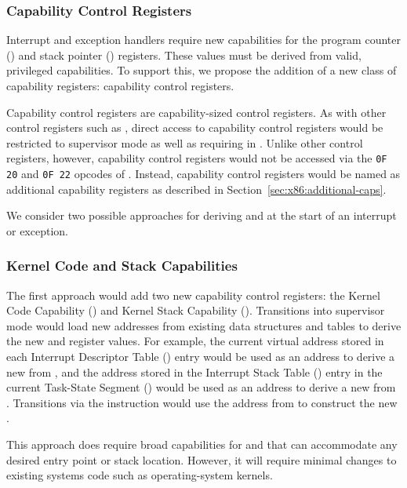\subsubsection{Capability Control Registers}
\label{sec:x86:capability-control-registers}

Interrupt and exception handlers require new capabilities for the
program counter (\CIP{}) and stack pointer (\CSP{}) registers.  These
values must be derived from valid, privileged capabilities.  To
support this, we propose the addition of a new class of capability
registers: capability control registers.

Capability control registers are capability-sized control registers.
As with other control registers such as \CRFOUR, direct access to
capability control registers would be restricted to supervisor mode as
well as requiring \cappermASR{} in \CIP{}.  Unlike other control
registers, however, capability control registers would not be accessed
via the \texttt{0F 20} and \texttt{0F 22} opcodes of .
Instead, capability control registers would be named as additional
capability registers as described in
Section~\ref{sec:x86:additional-caps}.

We consider two possible approaches for deriving \CIP{} and \CSP{} at
the start of an interrupt or exception.

\subsubsection{Kernel Code and Stack Capabilities}

The first approach would add two new capability control registers: the Kernel
Code Capability (\KCC{}) and Kernel Stack Capability (\KSC{}).  Transitions into
supervisor mode would load new addresses from
existing data structures and tables to derive the new \CIP{} and \CSP{}
register values.  For example, the current virtual address stored in
each Interrupt Descriptor Table (\IDT{}) entry would be used as an
address to derive a new \CIP{} from \KCC{}, and the address stored in the Interrupt
Stack Table (\IST{}) entry in the current Task-State Segment (\TSS{}) would
be used as an address to derive a new \CSP{} from \KSC{}.  Transitions via
the  instruction would use the address from \LSTAR{} to
construct the new \CIP{}.

This approach does require broad capabilities
for \KCC{} and \KSC{} that can accommodate any desired entry point or stack
location.  However, it will require minimal changes to existing systems
code such as operating-system kernels.

